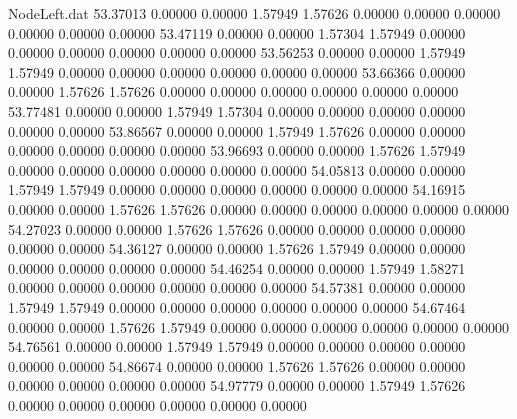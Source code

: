 \begin{filecontents}{NodeLeft.dat}
  53.37013    0.00000    0.00000     1.57949    1.57626    0.00000    0.00000    0.00000    0.00000    0.00000    0.00000
  53.47119    0.00000    0.00000     1.57304    1.57949    0.00000    0.00000    0.00000    0.00000    0.00000    0.00000
  53.56253    0.00000    0.00000     1.57949    1.57949    0.00000    0.00000    0.00000    0.00000    0.00000    0.00000
  53.66366    0.00000    0.00000     1.57626    1.57626    0.00000    0.00000    0.00000    0.00000    0.00000    0.00000
  53.77481    0.00000    0.00000     1.57949    1.57304    0.00000    0.00000    0.00000    0.00000    0.00000    0.00000
  53.86567    0.00000    0.00000     1.57949    1.57626    0.00000    0.00000    0.00000    0.00000    0.00000    0.00000
  53.96693    0.00000    0.00000     1.57626    1.57949    0.00000    0.00000    0.00000    0.00000    0.00000    0.00000
  54.05813    0.00000    0.00000     1.57949    1.57949    0.00000    0.00000    0.00000    0.00000    0.00000    0.00000
  54.16915    0.00000    0.00000     1.57626    1.57626    0.00000    0.00000    0.00000    0.00000    0.00000    0.00000
  54.27023    0.00000    0.00000     1.57626    1.57626    0.00000    0.00000    0.00000    0.00000    0.00000    0.00000
  54.36127    0.00000    0.00000     1.57626    1.57949    0.00000    0.00000    0.00000    0.00000    0.00000    0.00000
  54.46254    0.00000    0.00000     1.57949    1.58271    0.00000    0.00000    0.00000    0.00000    0.00000    0.00000
  54.57381    0.00000    0.00000     1.57949    1.57949    0.00000    0.00000    0.00000    0.00000    0.00000    0.00000
  54.67464    0.00000    0.00000     1.57626    1.57949    0.00000    0.00000    0.00000    0.00000    0.00000    0.00000
  54.76561    0.00000    0.00000     1.57949    1.57949    0.00000    0.00000    0.00000    0.00000    0.00000    0.00000
  54.86674    0.00000    0.00000     1.57626    1.57626    0.00000    0.00000    0.00000    0.00000    0.00000    0.00000
  54.97779    0.00000    0.00000     1.57949    1.57626    0.00000    0.00000    0.00000    0.00000    0.00000    0.00000
\end{filecontents}
